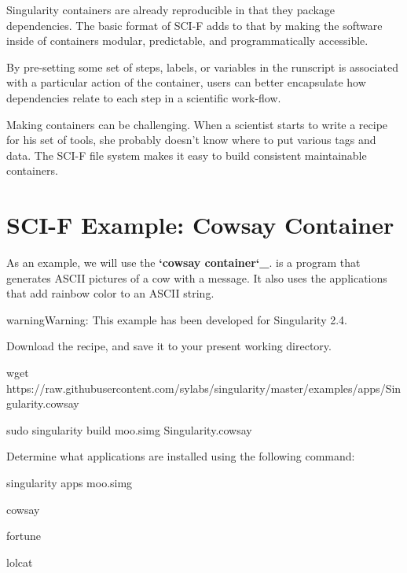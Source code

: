 \documentclass[letterpaper,10pt,english]{sphinxmanual}
\begin{document}
Singularity containers are already reproducible in that they package
dependencies. The basic format of SCI-F adds to that by making the software
inside of containers modular, predictable, and programmatically accessible.

By pre-setting some set of steps, labels, or variables in the
runscript is associated with a particular action of the container, users can better encapsulate how dependencies relate to each step in a scientific
work-flow.

Making containers can be challenging. When a scientist starts to
write a recipe for his set of tools, she probably doesn’t know where to
put various tags and data. The SCI-F file system makes it easy to build consistent maintainable containers.


\section{SCI-F Example: Cowsay Container}
\label{\detokenize{reproducible_scif_apps:sci-f-example-cowsay-container}}
As an example, we will use the {\color{red}\bfseries{}{}`cowsay container{}`\_}.  is a program that generates ASCII pictures of a cow with a message.
It also uses the  applications that add rainbow color to an ASCII string.

\begin{sphinxadmonition}{warning}{Warning:}
 This example has been developed for Singularity 2.4.
\end{sphinxadmonition}

Download the recipe, and save it to your
present working directory.

%
\begin{sphinxVerbatim}[commandchars=\\\{\}]
wget https://raw.githubusercontent.com/sylabs/singularity/master/examples/apps/Singularity.cowsay

sudo singularity build moo.simg Singularity.cowsay
\end{sphinxVerbatim}

Determine what applications are installed using the following command:

%
\begin{sphinxVerbatim}[commandchars=\\\{\}]
singularity apps moo.simg

cowsay

fortune

lolcat
\end{sphinxVerbatim}
\end{document}
